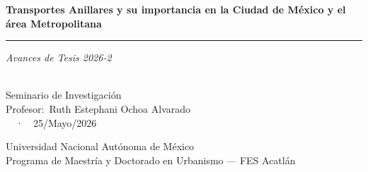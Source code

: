 
\begin{titlepage}
\thispagestyle{empty}
\setcounter{page}{0}
\centering

\vspace*{4cm}

{\huge\bfseries Transportes Anillares y su importancia en la Ciudad de México y el área Metropolitana}

\vspace{0.5cm}
{\color{ColorPrincipal}\rule{0.45\textwidth}{0.8pt}}
\vspace{0.4cm}

{\large\itshape\color{ColorTexto} Avances de Tesis 2026-2}

\vfill

{\normalsize\textbf{\Autor}}\\[0.4cm]
{\small Seminario de Investigación}\\[0.15cm]
{\small Profesor:\ Ruth Estephani Ochoa Alvarado}\\[0.15cm]
{\small \Semestre\ \ ·\ \ 25/Mayo/2026}

\vspace{1.8cm}

{\footnotesize\color{ColorPrincipal}
  Universidad Nacional Autónoma de México\\
  Programa de Maestría y Doctorado en Urbanismo — FES Acatlán%
}

\vspace{1cm}

\end{titlepage}
